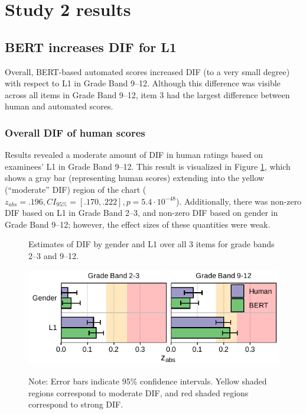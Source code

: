 \documentclass [PhD] {uclathes}
\begin{document}
\section{Study 2 results}

\subsection{BERT increases DIF for L1}
\label{res_rq1}

Overall, BERT-based automated scores increased DIF (to a very small degree) with respect to L1 in Grade Band 9–12. Although this difference was visible across all items in Grade Band 9–12, item 3 had the largest difference between human and automated scores. 

\subsubsection{Overall DIF of human scores}

Results revealed a moderate amount of DIF in human ratings based on examinees’ L1 in Grade Band 9–12. This result is visualized in Figure \ref{fig:zabs_ovr}, which shows a gray bar (representing human scores) extending into the yellow (“moderate” DIF) region of the chart ($z_{abs} = .196, CI_{95\%} = [.170, .222], p = 5.4 \cdot 10^{-48}$). Additionally, there was non-zero DIF based on L1 in Grade Band 2–3, and non-zero DIF based on gender in Grade Band 9–12; however, the effect sizes of these quantities were weak.

\begin{figure}[h]
    \centering
    \caption{Estimates of DIF by gender and L1 over all 3 items for grade bands 2–3 and 9–12.}    
    \includegraphics[width=4.5in]{figures/20230504_ETS-DIF_BERT_zabs_ovr_edit.pdf}
    \label{fig:zabs_ovr}
\caption*{\small Note: Error bars indicate 95\% confidence intervals. Yellow shaded regions correspond to moderate DIF, and red shaded regions correspond to strong DIF.}
\end{figure}
\end{document}
